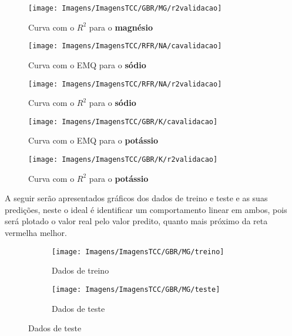 \documentclass[
12pt,				%
oneside,			%
a4paper,			%
english,			%
french,				%
spanish,			%
brazil				%
]{abntex2}
\begin{document}
\begin{figure}[H]
	\caption{Curva com o  $R^2$ para o \textbf{magnésio}}
	\centering %
	\texttt{[image: Imagens/ImagensTCC/GBR/MG/r2validacao]} %
	\label{fig:gmagr2val}
\end{figure}


\begin{figure}[H]
	\caption{Curva com o EMQ para o \textbf{sódio}}
	\centering %
	\texttt{[image: Imagens/ImagensTCC/RFR/NA/cavalidacao]} %
	\label{fig:rnacaval}
\end{figure}

\begin{figure}[H]
	\caption{Curva com o $R^2$ para o \textbf{sódio}}
	\centering %
	\texttt{[image: Imagens/ImagensTCC/RFR/NA/r2validacao]} %
	\label{fig:rnar2val}
\end{figure}


\begin{figure}[H]
	\caption{Curva com o EMQ para o \textbf{potássio}}
	\centering %
	\texttt{[image: Imagens/ImagensTCC/GBR/K/cavalidacao]} %
	\label{fig:gkcaval}
\end{figure}

\begin{figure}[H]
	\caption{Curva com o $R^2$ para o \textbf{potássio}}
	\centering %
	\texttt{[image: Imagens/ImagensTCC/GBR/K/r2validacao]} %
	\label{fig:gkr2val}
\end{figure}


A seguir serão apresentados gráficos dos dados de treino e teste e as suas predições, neste o ideal é identificar um comportamento linear em ambos, pois será plotado o valor real pelo valor predito, quanto mais próximo da reta vermelha melhor.

\begin{figure}[h]
	\caption{Dados reais e preditos do \textbf{magnésio} }
	\label{fig:realpredito}
	\begin{subfigure}{.5\textwidth}
		\centering
		\texttt{[image: Imagens/ImagensTCC/GBR/MG/treino]}
		\caption{Dados de treino}
		\label{fig:rptreinomg}
	\end{subfigure}%
	\begin{subfigure}{.5\textwidth}
		\centering
		\texttt{[image: Imagens/ImagensTCC/GBR/MG/teste]}
		\caption{Dados de teste}
		\label{fig:rptestemg}
	\end{subfigure}
\end{figure}
\end{document}
